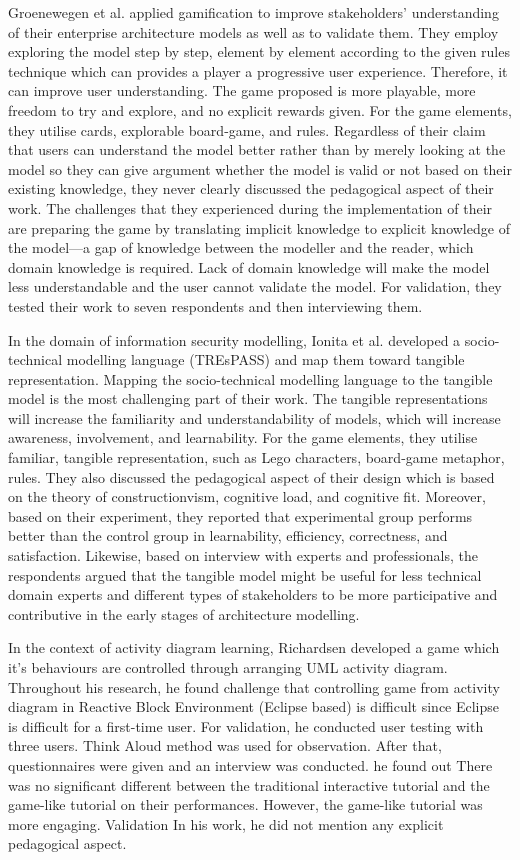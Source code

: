 \documentclass[a4paper]{Report}
\begin{document}
Groenewegen et al. \cite{Groenewegen2010} applied gamification to improve stakeholders' understanding of their enterprise architecture models as well as to validate them.
They employ exploring the model step by step, element by element according to the given rules technique which can provides a player a progressive user experience. Therefore, it can improve user understanding. The game proposed is more playable, more freedom to try and explore, and no explicit rewards given. For the game elements, they utilise cards, explorable board-game, and rules. 
Regardless of their claim that users can understand the model better rather than by merely looking at the model so they can give argument whether the model is valid or not based on their existing knowledge, they never clearly discussed the pedagogical aspect of their work. The challenges that they experienced during the implementation of their are preparing the game by translating implicit knowledge to explicit knowledge of the model—a gap of knowledge between the modeller and the reader, which domain knowledge is required. Lack of domain knowledge will make the model less understandable and the user cannot validate the model. For validation, they tested their work to seven respondents and then interviewing them. 

In the domain of information security modelling, Ionita et al.\cite{Ionita2015} developed a socio-technical modelling language (TREsPASS) and map them toward tangible representation. Mapping the socio-technical modelling language to the tangible model is the most challenging part of their work. The tangible representations will increase the familiarity and understandability of models, which will increase awareness, involvement, and learnability. For the game elements, they utilise familiar, tangible representation, such as Lego characters, board-game metaphor, rules. They also discussed the pedagogical aspect of their design which is based on the theory of constructionvism, cognitive load, and cognitive fit. Moreover, based on their experiment, they reported that experimental group performs better than the control group in learnability, efficiency, correctness, and satisfaction. Likewise, based on interview with experts and professionals, the respondents argued that the tangible model might be useful for less technical domain experts and different types of stakeholders to be more participative and contributive in the early stages of architecture modelling.

In the context of activity diagram learning, Richardsen  \cite{Richardsen2014} developed a game which it's behaviours are controlled through arranging UML activity diagram. Throughout his research, he found challenge that controlling game from activity diagram in Reactive Block Environment (Eclipse based) is difficult since Eclipse is difficult for a first-time user. For validation, he conducted user testing with three users. Think Aloud method was used for observation. After that, questionnaires were given and an interview was conducted. he found out There was no significant different between the traditional interactive tutorial and the game-like tutorial on their performances. However, the game-like tutorial was more engaging.
Validation In his work, he did not mention any explicit pedagogical aspect.
\end{document}
